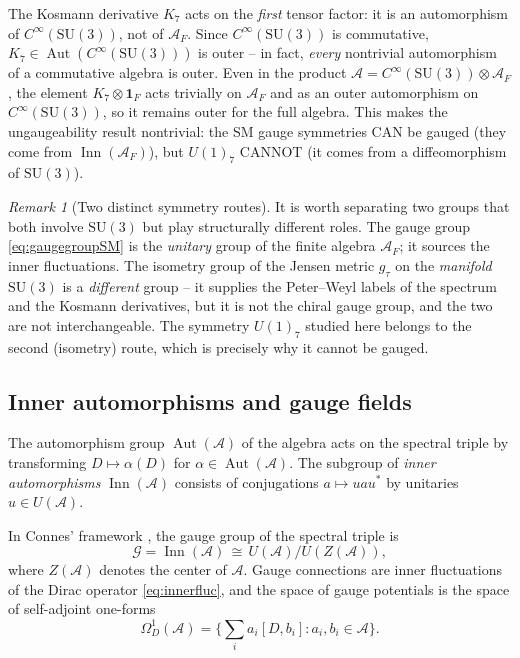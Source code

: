 \documentclass[12pt]{article}
\theoremstyle{definition}
\theoremstyle{remark}
\newtheorem{remark}[theorem]{Remark}
\newcommand{\Alg}{\mathcal{A}}
\newcommand{\Inn}{\operatorname{Inn}}
\newcommand{\Aut}{\operatorname{Aut}}
\begin{document}
The Kosmann derivative $K_7$ acts on the \emph{first} tensor factor: it is an automorphism of $C^\infty(\mathrm{SU}(3))$, not of $\Alg_F$.  Since $C^\infty(\mathrm{SU}(3))$ is commutative, $K_7 \in \Aut(C^\infty(\mathrm{SU}(3)))$ is outer -- in fact, \emph{every} nontrivial automorphism of a commutative algebra is outer.  Even in the product $\Alg = C^\infty(\mathrm{SU}(3)) \otimes \Alg_F$, the element $K_7 \otimes \mathbf{1}_F$ acts trivially on $\Alg_F$ and as an outer automorphism on $C^\infty(\mathrm{SU}(3))$, so it remains outer for the full algebra.  This makes the ungaugeability result nontrivial: the SM gauge symmetries CAN be gauged (they come from $\Inn(\Alg_F)$), but $U(1)_7$ CANNOT (it comes from a diffeomorphism of $\mathrm{SU}(3)$).

\begin{remark}[Two distinct symmetry routes]\label{rem:tworoutes}
It is worth separating two groups that both involve $\mathrm{SU}(3)$ but play structurally different roles.  The gauge group \eqref{eq:gaugegroupSM} is the \emph{unitary} group of the finite algebra $\Alg_F$; it sources the inner fluctuations.  The isometry group of the Jensen metric $g_\tau$ on the \emph{manifold} $\mathrm{SU}(3)$ is a \emph{different} group -- it supplies the Peter--Weyl labels of the spectrum and the Kosmann derivatives, but it is not the chiral gauge group, and the two are not interchangeable.  The symmetry $U(1)_7$ studied here belongs to the second (isometry) route, which is precisely why it cannot be gauged.
\end{remark}

\subsection{Inner automorphisms and gauge fields}
\label{subsec:innerauto}

The automorphism group $\Aut(\Alg)$ of the algebra acts on the spectral triple by transforming $D \mapsto \alpha(D)$ for $\alpha \in \Aut(\Alg)$.  The subgroup of \emph{inner automorphisms} $\Inn(\Alg)$ consists of conjugations $a \mapsto u a u^*$ by unitaries $u \in U(\Alg)$.

In Connes' framework \cite{Connes1996gravity, Connes1994book, vanSuijlekom2015book}, the gauge group of the spectral triple is
\begin{equation}\label{eq:gaugegroup}
  \mathcal{G} = \Inn(\Alg) \,\cong\, U(\Alg) / U(Z(\Alg)),
\end{equation}
where $Z(\Alg)$ denotes the center of $\Alg$.  Gauge connections are inner fluctuations of the Dirac operator \eqref{eq:innerfluc}, and the space of gauge potentials is the space of self-adjoint one-forms
\begin{equation}\label{eq:omega1}
  \Omega^1_D(\Alg) = \Big\{\sum_i a_i [D, b_i] : a_i, b_i \in \Alg\Big\}.
\end{equation}
\end{document}
